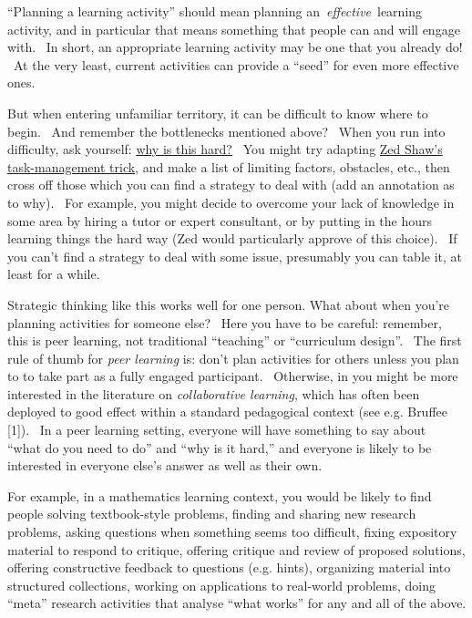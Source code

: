 ``Planning a learning activity'' should mean planning
an~\emph{effective}~learning activity, and in particular that means
something that people can and will engage with. ~In short, an
appropriate learning activity may be one that you already do! ~At the
very least, current activities can provide a ``seed'' for even more
effective ones.

But when entering unfamiliar territory, it can be difficult to know
where to begin.~ And remember the bottlenecks mentioned above?~ When you
run into difficulty, ask yourself:
\href{http://peeragogy.org/patterns-and-heuristics/}{why is this hard?}~
You might try adapting
\href{http://learnpythonthehardway.org/book/intro.html\#comment-409972596}{Zed
Shaw's task-management trick}, and make a list of limiting factors,
obstacles, etc., then cross off those which you can find a strategy to
deal with (add an annotation as to why). ~For example, you might decide
to overcome your lack of knowledge in some area by hiring a tutor or
expert consultant, or by putting in the hours learning things the hard
way (Zed would particularly approve of this choice).~ If you can't find
a strategy to deal with some issue, presumably you can table it, at
least for a while.

Strategic thinking like this works well for one person. What about when
you're planning activities for someone else? ~Here you have to be
careful: remember, this is peer learning, not traditional ``teaching''
or ``curriculum design''. ~The first rule of thumb for \emph{peer
learning} is: don't plan activities for others unless you plan to to
take part as a fully engaged participant.~ Otherwise, in you might be
more interested in the literature on \emph{collaborative learning},
which has often been deployed to good effect within a standard
pedagogical context (see e.g. Bruffee {[}1{]}).~ In a peer learning
setting, everyone will have something to say about~ ``what do you need
to do'' and ``why is it hard,'' and everyone is likely to be interested
in everyone else's answer as well as their own.

For example, in a mathematics learning context, you would be likely to
find people
  solving textbook-style problems,
%
  finding and sharing new research problems,
%
  asking questions when something seems too difficult,
%
  fixing expository material to respond to critique,
%
  offering critique and review of proposed solutions,
%
  offering constructive feedback to questions (e.g. hints),
%
  organizing material into structured collections,
%
  working on applications to real-world problems,
%
  doing ``meta'' research activities that analyse ``what works'' for any
  and all of the above.

